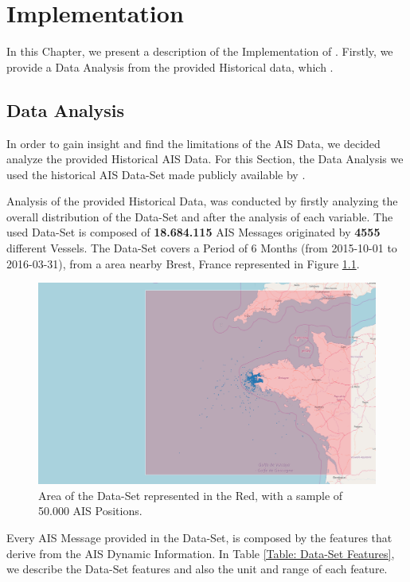 \chapter{Implementation}
\label{chapter:Chapter 4}

In this Chapter, we present a description of the Implementation of . Firstly, we provide a Data Analysis from the provided Historical data, which .

\section{Data Analysis}
\label{section: Data Analysis}
In order to gain insight and find the limitations of the AIS Data, we decided analyze the provided Historical AIS Data. For this Section, the Data Analysis we used the historical AIS Data-Set made publicly available by \cite{DATASET}.

Analysis of the provided Historical Data, was conducted by firstly analyzing the overall distribution of the Data-Set and after the analysis of each variable. 
The used Data-Set is composed of \textbf{18.684.115} AIS Messages originated by \textbf{4555} different Vessels. The Data-Set covers a Period of 6 Months (from 2015-10-01 to 2016-03-31), from a area nearby Brest, France represented in Figure \ref{fig:DS_Sample}.

\begin{figure}[H]
	\centering
	\includegraphics[scale = .23]{figures/Ch4/nari_DS_ex2.png}
    \caption{Area of the Data-Set represented in the Red, with a sample of 50.000 AIS Positions.}
    \label{fig:DS_Sample}
\end{figure}
Every AIS Message provided in the Data-Set, is composed by the features that derive from the AIS Dynamic Information. In Table \ref{Table: Data-Set Features}, we describe the Data-Set features and also the unit and range of each feature. 

